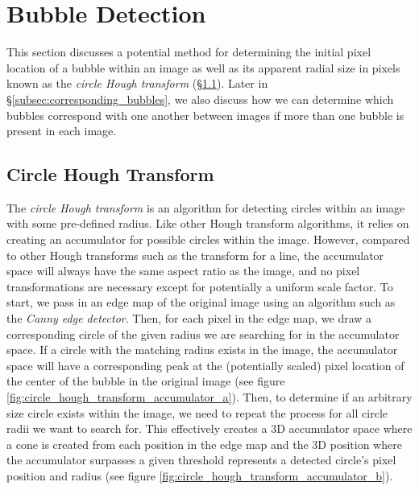 \documentclass[11pt, letterpaper]{extarticle} %
\begin{document}
\section{Bubble Detection} \label{sec:bubble_detection}
This section discusses a potential method for determining the initial pixel location of a bubble within an image as well as its apparent radial size in pixels known as the \textit{circle Hough transform} (\S\ref{subsec:circle_hough_transform}). Later in \S\ref{subsec:corresponding_bubbles}, we also discuss how we can determine which bubbles correspond with one another between images if more than one bubble is present in each image.

\subsection{Circle Hough Transform} \label{subsec:circle_hough_transform}
The \textit{circle Hough transform} is an algorithm for detecting circles within an image with some pre-defined radius. Like other Hough transform algorithms, it relies on creating an accumulator for possible circles within the image. However, compared to other Hough transforms such as the transform for a line, the accumulator space will always have the same aspect ratio as the image, and no pixel transformations are necessary except for potentially a uniform scale factor. To start, we pass in an edge map of the original image using an algorithm such as the \textit{Canny edge detector}. Then, for each pixel in the edge map, we draw a corresponding circle of the given radius we are searching for in the accumulator space. If a circle with the matching radius exists in the image, the accumulator space will have a corresponding peak at the (potentially scaled) pixel location of the center of the bubble in the original image (see figure \ref{fig:circle_hough_transform_accumulator_a}). Then, to determine if an arbitrary size circle exists within the image, we need to repeat the process for all circle radii we want to search for. This effectively creates a 3D accumulator space where a cone is created from each position in the edge map and the 3D position where the accumulator surpasses a given threshold represents a detected circle's pixel position and radius (see figure \ref{fig:circle_hough_transform_accumulator_b}).
\end{document}
